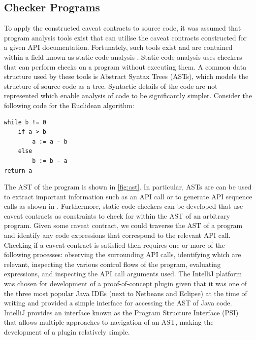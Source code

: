 \subsection{Checker Programs}
To apply the constructed caveat contracts to source code, it was assumed that program analysis tools exist that can utilise the caveat contracts constructed for a given API documentation. Fortunately, such tools exist and are contained within a field known as static code analysis \cite{1657940}. Static code analysis uses checkers that can perform checks on a program without executing them. A common data structure used by these tools is Abstract Syntax Trees (ASTs), which models the structure of source code as a tree. Syntactic details of the code are not represented which enable analysis of code to be significantly simpler. Consider the following code for the Euclidean algorithm:

\begin{verbatim}
while b != 0
    if a > b
        a := a - b
    else
        b := b - a
return a
\end{verbatim}

The AST of the program is shown in \ref{fig:ast}. In particular, ASTs are can be used to extract important information such as an API call or to generate API sequence calls as shown in \cite{code-examples}. Furthermore, static code checkers can be developed that use caveat contracts as constraints to check for within the AST of an arbitrary program. Given some caveat contract, we could traverse the AST of a program and identify any code expressions that correspond to the relevant API call. Checking if a caveat contract is satisfied then requires one or more of the following processes: observing the surrounding API calls, identifying which are relevant, inspecting the various control flows of the program, evaluating expressions, and inspecting the API call arguments used.
The IntelliJ platform was chosen for development of a proof-of-concept plugin given that it was one of the three most popular Java IDEs (next to Netbeans and Eclipse) at the time of writing and provided a simple interface for accessing the AST of Java code. IntelliJ provides an interface known as the Program Structure Interface (PSI) that allows multiple approaches to navigation of an AST, making the development of a plugin relatively simple.

